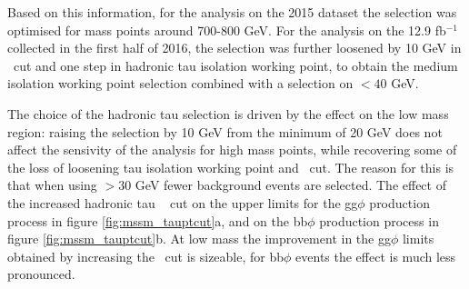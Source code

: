 Based on this information, for the analysis on the 2015 dataset the selection was optimised
for mass points around 700-800 GeV. For the analysis on the 12.9 fb$^{-1}$ collected
in the first half of 2016, the selection was further loosened by 10 GeV in \mT~cut
and one step in hadronic tau isolation working point, to obtain the medium isolation working
point selection combined with a selection on \mT$<40$ GeV.

The choice of the hadronic tau \pT selection is driven by the effect on the low mass region:
raising the \pT selection by 10 GeV from the minimum of 20 GeV does not affect the sensivity
of the analysis for high mass points, while recovering some of the loss of loosening 
tau isolation working point and \mT~cut. The reason for this is that when using \pT$>30$ GeV 
fewer background events are selected. The effect of the increased hadronic tau \pT~ cut on the 
upper limits for the gg$\phi$ production process
in figure \ref{fig:mssm_tauptcut}a, and on the bb$\phi$ production process
in figure \ref{fig:mssm_tauptcut}b. At low mass the improvement in the gg$\phi$ limits
obtained by increasing the \pT~cut is sizeable, for bb$\phi$ events the effect is much
less pronounced.

